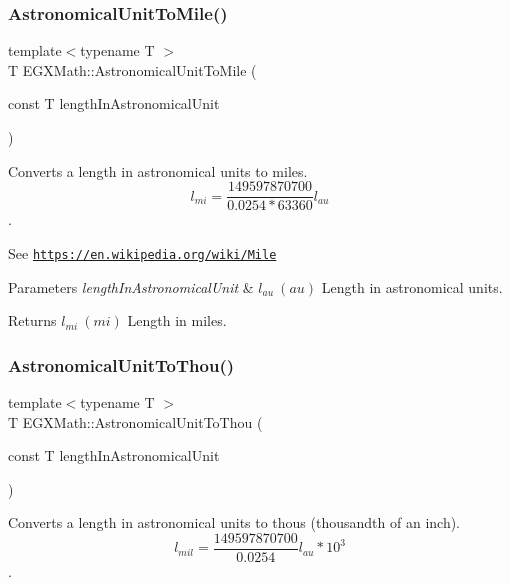 \subsubsection{\texorpdfstring{Astronomical\+Unit\+To\+Mile()}{AstronomicalUnitToMile()}}
{\footnotesize\ttfamily template$<$typename T $>$ \\
T E\+G\+X\+Math\+::\+Astronomical\+Unit\+To\+Mile (\begin{DoxyParamCaption}\item[{const T}]{length\+In\+Astronomical\+Unit }\end{DoxyParamCaption})}



Converts a length in astronomical units to miles. \[ l_{mi}=\frac{149597870700}{0.0254 * 63360} l_{au} \]. 

See \href{https://en.wikipedia.org/wiki/Mile}{\tt https\+://en.\+wikipedia.\+org/wiki/\+Mile} 
\begin{DoxyParams}{Parameters}
{\em length\+In\+Astronomical\+Unit} & $ l_{au}\ (au)$ Length in astronomical units. \\
\hline
\end{DoxyParams}
\begin{DoxyReturn}{Returns}
$ l_{mi}\ (mi)$ Length in miles. 
\end{DoxyReturn}
\mbox{\label{group___e_g_x_math-_conversions-_length_conversions-_astronomical-_astronomical_unit-_imperial_ga6c8f186a4c27fd488b82e76d8e27f8a8}} 
\subsubsection{\texorpdfstring{Astronomical\+Unit\+To\+Thou()}{AstronomicalUnitToThou()}}
{\footnotesize\ttfamily template$<$typename T $>$ \\
T E\+G\+X\+Math\+::\+Astronomical\+Unit\+To\+Thou (\begin{DoxyParamCaption}\item[{const T}]{length\+In\+Astronomical\+Unit }\end{DoxyParamCaption})}



Converts a length in astronomical units to thous (thousandth of an inch). \[ l_{mil}= \frac{149597870700}{0.0254} l_{au} * 10^{3} \]. 

